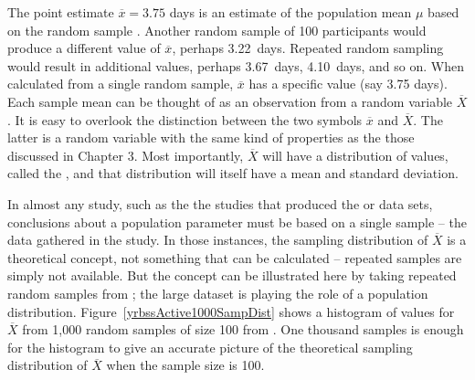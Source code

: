 \begin{spacing}{1.5}
The point estimate $\overline{x} = 3.75$ days is an estimate of the population mean $\mu$ based on the random sample .  Another random sample of 100 participants would produce a different value of $\overline{x}$, perhaps  3.22~days. Repeated random sampling would result in additional values, perhaps 3.67~days, 4.10~days, and so on. When calculated from a single random sample, $\overline{x}$ has a specific value (say 3.75 days).  Each sample mean can be thought of as an observation from a random variable $\overline{X}$.  It is easy to overlook the distinction between the two symbols $\overline{x}$ and $\overline{X}$. The latter is a random variable with the same kind of properties as the those discussed in Chapter 3. Most importantly, $\overline{X}$ will have a distribution of values, called the , and that distribution will itself have a mean and standard deviation.

In almost any study, such as the the studies that produced the  or  data sets, conclusions about a population parameter must be based on a single sample -- the data gathered in the study.  In those instances, the sampling distribution of $\overline{X}$ is a theoretical concept, not something that can be calculated -- repeated samples are simply not available.  But the concept can be illustrated here by taking repeated random samples from ; the large dataset  is playing the role of a population distribution. Figure~\ref{yrbssActive1000SampDist} shows a histogram of values for $\overline{X}$ from 1,000 random samples of size 100 from . One thousand samples is enough for the histogram to give an accurate picture of the theoretical sampling distribution of $\overline{X}$ when the sample size is 100. 

\end{spacing}
